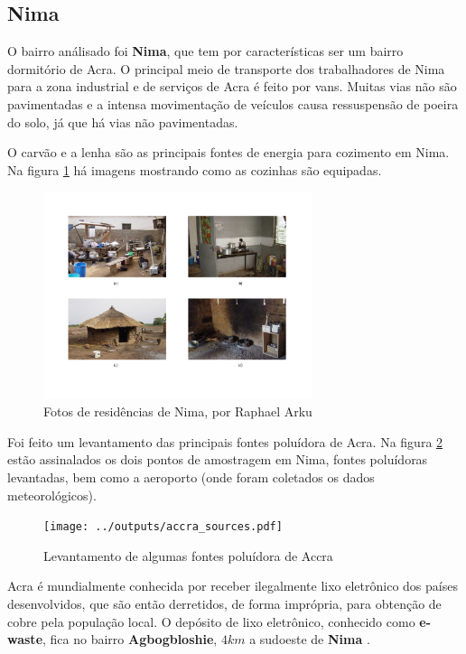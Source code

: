\subsection{Nima}

O bairro análisado foi \textbf{Nima}, que tem por características
ser um bairro dormitório de Acra. O principal meio de transporte
dos trabalhadores de Nima para a zona industrial e de serviços de Acra é 
feito por vans. Muitas vias não são pavimentadas e a intensa movimentação
de veículos causa ressuspensão de poeira do solo, já que há vias não
pavimentadas.

O carvão e a lenha são as principais fontes de energia para cozimento 
em Nima. Na figura \ref{fig:nima} há imagens mostrando como as cozinhas
são equipadas. 

\begin{figure}[H]
  \centering
    \includegraphics[width=0.7\textwidth]{../inputs/images/zheng/nima.pdf}
    \caption{Fotos de residências de Nima, por Raphael Arku \label{fig:nima}}
\end{figure}

Foi feito um levantamento das principais fontes poluídora de Acra.
Na figura \ref{fg:acrasources} estão assinalados os dois pontos de 
amostragem em Nima, fontes poluídoras levantadas, bem como a aeroporto
(onde foram coletados os dados meteorológicos).

\begin{figure}[H]
  \centering
  \texttt{[image: ../outputs/accra\_sources.pdf]}
  \caption{Levantamento de algumas fontes poluídora de Accra \label{fg:acrasources}}
\end{figure}

Acra é mundialmente conhecida por receber ilegalmente lixo 
eletrônico dos países desenvolvidos, que são então derretidos, de forma
imprópria, para obtenção de cobre pela população local. 
O depósito de lixo eletrônico, conhecido como \textbf{e-waste}, 
fica no bairro \textbf{Agbogbloshie}, $4 km$ a sudoeste de \textbf{Nima}
\citep{asampong2015}.

